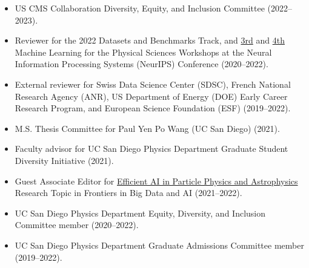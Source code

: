 \documentclass[11pt]{res}
\begin{document}
\begin{resume}
\begin{itemize}
    \item US CMS Collaboration Diversity, Equity, and Inclusion Committee ({2022--2023}).
    \item Reviewer for the 2022 Datasets and Benchmarks Track, and \href{https://ml4physicalsciences.github.io/2020/}{3rd} and \href{https://ml4physicalsciences.github.io/2021/}{4th} Machine Learning for the Physical Sciences Workshops at the Neural Information Processing Systems (NeurIPS) Conference ({2020--2022}).
    \item External reviewer for Swiss Data Science Center (SDSC), French National Research Agency (ANR), US Department of Energy (DOE) Early Career Research Program, and European Science Foundation (ESF) ({2019--2022}).
    \item M.S. Thesis Committee for Paul Yen Po Wang (UC San Diego) ({2021}).
    \item Faculty advisor for UC San Diego Physics Department Graduate Student Diversity Initiative ({2021}).
    \item Guest Associate Editor for \href{https://www.frontiersin.org/research-topics/19095/efficient-ai-in-particle-physics-and-astrophysics}{Efficient AI in Particle Physics and Astrophysics} Research Topic in Frontiers in Big Data and AI ({2021--2022}).
    \item UC San Diego Physics Department Equity, Diversity, and Inclusion Committee member ({2020--2022}).
    \item UC San Diego Physics Department Graduate Admissions Committee member ({2019--2022}).
  \end{itemize}


\end{resume}
\end{document}

